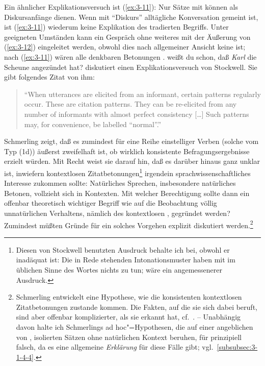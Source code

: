 \documentclass[output=paper]{langsci/langscibook}
\begin{document}
Ein ähnlicher Explikationsversuch ist (\ref{ex:3-11}):
\ea
\label{ex:3-11}
Nur Sätze mit  können als Diskursanfänge dienen.
\z
Wenn mit "`Diskurs"' alltägliche Konversation gemeint ist, ist (\ref{ex:3-11})
wiederum keine Explikation des tradierten Begriffs. Unter geeigneten
Umständen kann ein Gespräch \zb ohne weiteres mit der Äußerung von
(\ref{ex:3-12}) eingeleitet werden, obwohl dies nach allgemeiner Ansicht keine
 ist; nach (\ref{ex:3-11}) wären alle denkbaren Betonungen
.
\ea
\label{ex:3-12}
weißt du schon, daß \textit{Karl} die Scheune angezündet hat?
\z
\addlines
\citet[50ff]{Schmerling76} diskutiert einen Explikationsversuch von Stockwell. Sie gibt folgendes Zitat von ihm:
\begin{quotation}
  "`When utterances are elicited from an informant, certain 
  patterns regularly occur. These are citation patterns. They can be
  re-elicited from any number of informants with almost perfect
  consistency [\ldots] Such patterns may, for convenience, be labelled
  "`normal"'."' \citep[50]{Schmerling76}
\end{quotation}
Schmerling zeigt, daß es zumindest für eine Reihe einstelliger Verben (solche vom Typ (1d)) äußerst
zweifelhaft ist, ob wirklich konsistente Befragungsergebnisse erzielt würden. Mit Recht weist sie
darauf hin, daß es darüber hinaus ganz unklar ist, inwiefern kontextlosen
Zitatbetonungen\footnote{\label{fn:3-3}%
  Diesen von Stockwell benutzten Ausdruck behalte ich bei, obwohl er inadäquat ist: Die in Rede
  stehenden Intonationsmuster haben mit  im üblichen Sinne des Wortes nichts zu tun;
   wäre ein angemessenerer Ausdruck.%
}
irgendein sprachwissenschaftliches Interesse zukommen sollte: Natürliches Sprechen, insbesondere
natürliches Betonen, vollzieht sich in Kontexten. Mit welcher Berechtigung sollte dann ein offenbar
theoretisch wichtiger Begriff wie  auf die Beobachtung völlig unnatürlichen
Verhaltens, nämlich des kontextlosen , gegründet werden? Zumindest müßten Gründe
für ein solches Vorgehen explizit diskutiert werden.\footnote{\label{fn:3-4}%
  Schmerling entwickelt eine Hypothese, wie die konsistenten kontextlosen Zitatbetonungen zustande
  kommen. Die Fakten, auf die sie sich dabei beruft, sind aber offenbar komplizierter, als sie
  erkannt hat, cf.\ \citet[956]{Bean78}. -- Unabhängig davon halte ich Schmerlings ad
  hoc"=Hypothesen, die auf einer angeblichen  von ,
  \dash isolierten Sätzen ohne natürlichen Kontext beruhen, für prinzipiell falsch, da es eine
  allgemeine \textit{Erklärung} für diese Fälle gibt; vgl.\ \ref{subsubsec:3-1-4-4}.%
}
\end{document}
